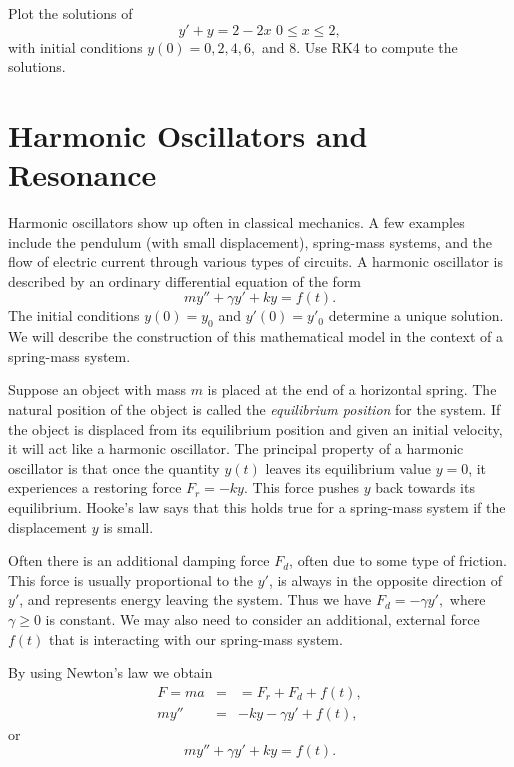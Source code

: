 \begin{problem}
Plot the solutions of 
\[ y' + y = 2-2x\,\, 0 \leq x \leq 2, \] 
with initial conditions $y(0) = 0, 2, 4, 6, $ and $8$. Use RK4 to compute the solutions. 
\end{problem}

\pagebreak
\section{Harmonic Oscillators and Resonance}

Harmonic oscillators show up often in classical mechanics. A few examples include the pendulum (with small displacement), spring-mass systems, and the flow of electric current through various types of circuits. 
A harmonic oscillator is described by an ordinary differential equation of the form \[my'' + \gamma y' + ky = f(t) .\] The initial conditions $y(0) = y_0$ and $y'(0) = y'_0$ determine a unique solution. 
We will describe the construction of this mathematical model in the context of a spring-mass system.

Suppose an object with mass $m$ is placed at the end of a horizontal spring. The natural position of the object is called the \textit{equilibrium position} for the system.
If the object is displaced from its equilibrium position and given an initial velocity,  
it will act like a harmonic oscillator.
The principal property of a harmonic oscillator is that once the quantity $y(t)$ leaves its equilibrium value $y = 0$, it experiences a restoring force $F_r = -ky.$ This force pushes $y$ back towards its equilibrium. Hooke's law says that this holds true for a 
spring-mass system if the displacement $y$ is small.

Often there is an additional damping force $F_d$, often due to some type of friction. This force is usually proportional to the $y'$, is always in the opposite direction of $y'$, and represents energy leaving the system. 
Thus we have $F_d = -\gamma y', $ where $ \gamma \geq 0$ is constant. 
We may also need to consider an additional, external force $f(t)$ that is interacting with our spring-mass system.
 

By using Newton's law we obtain
\begin{eqnarray*}
F = ma &=&= F_r + F_d + f(t),\\
my'' &=& -ky -\gamma y' + f(t),
\end{eqnarray*}
or 
\[my''+\gamma y' + ky = f(t). \]

